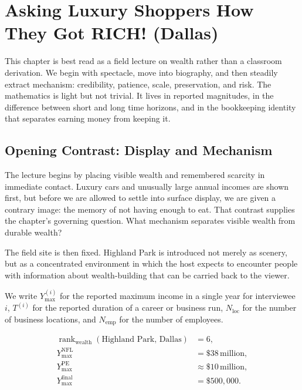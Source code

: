 \chapter{Asking Luxury Shoppers How They Got RICH! (Dallas)}

This chapter is best read as a field lecture on wealth rather than a classroom derivation. We begin with spectacle, move into biography, and then steadily extract mechanism: credibility, patience, scale, preservation, and risk. The mathematics is light but not trivial. It lives in reported magnitudes, in the difference between short and long time horizons, and in the bookkeeping identity that separates earning money from keeping it.

\section{Opening Contrast: Display and Mechanism}

The lecture begins by placing visible wealth and remembered scarcity in immediate contact. Luxury cars and unusually large annual incomes are shown first, but before we are allowed to settle into surface display, we are given a contrary image: the memory of not having enough to eat. That contrast supplies the chapter's governing question. What mechanism separates visible wealth from durable wealth?

The field site is then fixed. Highland Park is introduced not merely as scenery, but as a concentrated environment in which the host expects to encounter people with information about wealth-building that can be carried back to the viewer.

\begin{definition}
We write \(Y_{\max}^{(i)}\) for the reported maximum income in a single year for interviewee \(i\), \(T^{(i)}\) for the reported duration of a career or business run, \(N_{\mathrm{loc}}\) for the number of business locations, and \(N_{\mathrm{emp}}\) for the number of employees.
\end{definition}

\begin{align}
\operatorname{rank}_{\mathrm{wealth}}(\text{Highland Park, Dallas}) &= 6,\\
Y_{\max}^{\mathrm{NFL}} &= \$38\,\text{million},\\
Y_{\max}^{\mathrm{PE}} &\approx \$10\,\text{million},\\
Y_{\max}^{\mathrm{final}} &= \$500{,}000.
\end{align}

